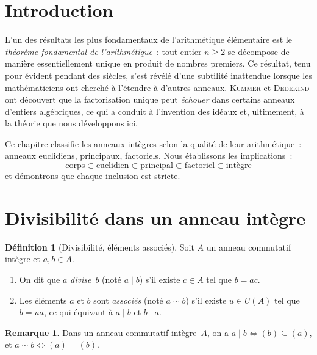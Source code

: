 \documentclass[12pt,a4paper,openany]{book}
\theoremstyle{definition}
\newtheorem{definition}{Définition}[chapter]
\newtheorem{remarque}{Remarque}[chapter]
\begin{document}
\section*{Introduction}

L'un des résultats les plus fondamentaux de l'arithmétique élémentaire
est le \emph{théorème fondamental de l'arithmétique}~: tout entier
$n \geqslant 2$ se décompose de manière essentiellement unique en produit
de nombres premiers. Ce résultat, tenu pour évident pendant des siècles,
s'est révélé d'une subtilité inattendue lorsque les mathématiciens ont
cherché à l'étendre à d'autres anneaux. \textsc{Kummer}
et \textsc{Dedekind} ont découvert que la
factorisation unique peut \emph{échouer} dans certains anneaux d'entiers
algébriques, ce qui a conduit à l'invention des idéaux et,
ultimement, à la théorie que nous développons ici.

Ce chapitre classifie les anneaux intègres selon la qualité de leur
arithmétique~: anneaux euclidiens, principaux, factoriels. Nous
établissons les implications~:
\[
  \text{corps} \subset \text{euclidien} \subset \text{principal}
  \subset \text{factoriel} \subset \text{intègre}
\]
et démontrons que chaque inclusion est stricte.

\section{Divisibilité dans un anneau intègre}\label{sec:divisibilite}

\begin{definition}[Divisibilité, éléments associés]\label{def:divisibilite}
Soit $A$ un anneau commutatif intègre et $a, b \in A$.
\begin{enumerate}[label=\textup{(\roman*)}]
  \item On dit que $a$ \emph{divise}~$b$ (noté $a \mid b$) s'il existe
        $c \in A$ tel que $b = ac$.
  \item Les éléments $a$ et $b$ sont \emph{associés} (noté $a \sim b$)
        s'il existe $u \in U(A)$ tel que $b = ua$, ce qui équivaut à
        $a \mid b$ et $b \mid a$.
\end{enumerate}
\end{definition}

\begin{remarque}\label{rem:divisibilite-ideaux}
Dans un anneau commutatif intègre~$A$, on a
$a \mid b \iff (b) \subseteq (a)$, et $a \sim b \iff (a) = (b)$.
\end{remarque}
\end{document}

